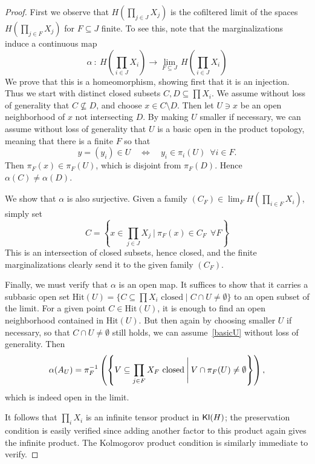 \documentclass[11pt]{article}
\begin{document}
\begin{proof}
    First we observe that $H(\prod_{j\in J} X_j)$ is the cofiltered limit of the spaces
    $H(\prod_{j\in F} X_j)$ for $F \subseteq J$ finite.
    To see this, note that the marginalizations induce a continuous map
    	\[
		\alpha \: : \: H\!\left(\prod_{i\in J} X_i\right) \longrightarrow \lim_{F \subseteq J} \, H\!\left(\prod_{i \in J} X_i\right)
	\]
	We prove that this is a homeomorphism, showing first that it is an injection. Thus we start with distinct closed subsets $C, D \subseteq \prod X_i$. We assume without loss of generality that $C \not\subseteq D$, and choose $x \in C \setminus D$.
    Then let $U \ni x$ be an open neighborhood of $x$ not intersecting $D$.
    By making $U$ smaller if necessary, we can assume without loss of generality that $U$ is a basic open in the product topology, meaning that there is a finite $F$ so that
    \begin{equation}
	    \label{basicU}
		y = (y_i) \in U \quad\Longleftrightarrow\quad y_i \in \pi_i(U) \:\; \forall i \in F.
    \end{equation}
    Then $\pi_F(x) \in \pi_F(U)$, which is disjoint from $\pi_F(D)$. Hence $\alpha(C) \neq \alpha(D)$.

    We show that $\alpha$ is also surjective. Given a family $(C_F) \in \lim_F H\!\left(\prod_{i \in F} X_i\right)$, simply set
	\[
		C = \left\{x \in \prod_{j\in J} X_j \:\Bigg|\: \pi_F(x) \in C_F \:\: \forall F\right\}
	\]
	This is an intersection of closed subsets, hence closed, and the finite marginalizations clearly send it to the given family $(C_F)$.

	Finally, we must verify that $\alpha$ is an open map.
	It suffices to show that it carries a subbasic open set $\mathrm{Hit}(U) = \{C \subseteq \prod X_i \text{ closed} \mid C \cap U \neq \emptyset\}$ to an open subset of the limit. For a given point $C \in \mathrm{Hit}(U)$, it is enough to find an open neighborhood contained in $\mathrm{Hit}(U)$. 
	But then again by choosing smaller $U$ if necessary, so that $C \cap U \neq \emptyset$ still holds, we can assume~\eqref{basicU} without loss of generality.
    Then
	\[
		\alpha(A_U) = \pi_F^{-1}\left(\left\{V \subseteq \prod_{j \in F} X_F \text{ closed} \:\Bigg|\: V \cap \pi_F(U) \neq \emptyset\right\}\right),
	\]
    which is indeed open in the limit.

    It follows that $\prod_i X_i$ is an infinite tensor product in $\operatorname{\mathsf{Kl}}(H)$; the preservation condition is easily verified since adding another factor to this product again gives the infinite product. The Kolmogorov product condition is similarly immediate to verify.
\end{proof}
\end{document}
